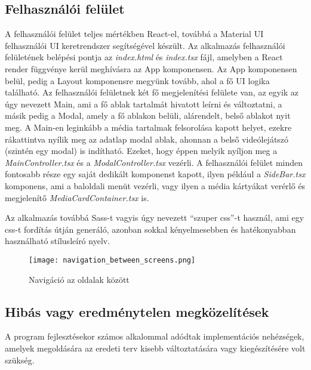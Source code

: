 \subsection{Felhasználói felület}
A felhasználói felület teljes mértékben React-el, továbbá a Material UI\cite{material-ui} felhasználói UI keretrendszer segítségével készült. Az alkalmazás felhasználói felületének belépési pontja az {\it index.html} és {\it index.tsx} fájl, amelyben a React render függvénye kerül meghívásra az App komponensen. Az App komponensen belül, pedig a Layout komponensre megyünk tovább, ahol a fő UI logika található.
Az felhasználói felületnek két fő megjelenítési felülete van, az egyik az úgy nevezett Main, ami a fő ablak tartalmát hivatott leírni és változtatni, a másik pedig a Modal, amely a fő ablakon belüli, alárendelt, belső ablakot nyit meg.
A Main-en leginkább a média tartalmak felsorolása kapott helyet, ezekre rákattintva nyílik meg az adatlap modal ablak, ahonnan a belső videólejátszó (szintén egy modal) is indítható. Ezeket, hogy éppen melyik nyíljon meg a {\it MainController.tsx} és a {\it ModalController.tsx} vezérli. A felhasználói felület minden fontosabb része egy saját dedikált komponenst kapott, ilyen például a {\it SideBar.tsx} komponens, ami a baloldali menüt vezérli, vagy ilyen a média kártyákat verérlő és megjelenítő {\it MediaCardContainer.tsx} is.

Az alkalmazás továbbá Sass-t\cite{sass} vagyis úgy nevezett ``szuper css''-t használ, ami egy css-t fordítás útján generáló, azonban sokkal kényelmesebben és hatékonyabban használható stílusleíró nyelv.

\begin{figure}[H]
	\centering
	\texttt{[image: navigation\_between\_screens.png]}
	\caption{Navigáció az oldalak között}
	\label{fig:navigation_between_screens}
\end{figure}

\subsection{Hibás vagy eredménytelen megközelítések}
A program fejlesztésekor számos alkalommal adódtak implementációs nehézségek, amelyek megoldására az eredeti terv kisebb változtatására vagy kiegészítésére volt szükség.

